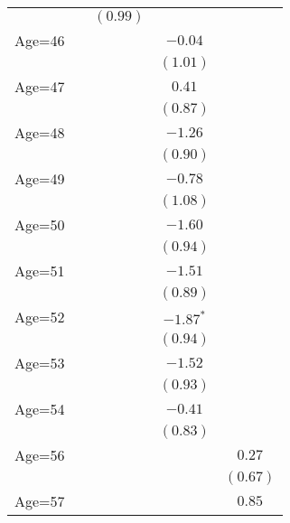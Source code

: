 \documentclass[fullpage]{paper}
\begin{document}
\begin{center}
\begin{longtable}{l c c c c }
            &               & $(0.99)$      &               &               \\
Age=46      &               &               & $-0.04$       &               \\
            &               &               & $(1.01)$      &               \\
Age=47      &               &               & $0.41$        &               \\
            &               &               & $(0.87)$      &               \\
Age=48      &               &               & $-1.26$       &               \\
            &               &               & $(0.90)$      &               \\
Age=49      &               &               & $-0.78$       &               \\
            &               &               & $(1.08)$      &               \\
Age=50      &               &               & $-1.60$       &               \\
            &               &               & $(0.94)$      &               \\
Age=51      &               &               & $-1.51$       &               \\
            &               &               & $(0.89)$      &               \\
Age=52      &               &               & $-1.87^{*}$   &               \\
            &               &               & $(0.94)$      &               \\
Age=53      &               &               & $-1.52$       &               \\
            &               &               & $(0.93)$      &               \\
Age=54      &               &               & $-0.41$       &               \\
            &               &               & $(0.83)$      &               \\
Age=56      &               &               &               & $0.27$        \\
            &               &               &               & $(0.67)$      \\
Age=57      &               &               &               & $0.85$        \\

\end{longtable}
\end{center}
\end{document}
